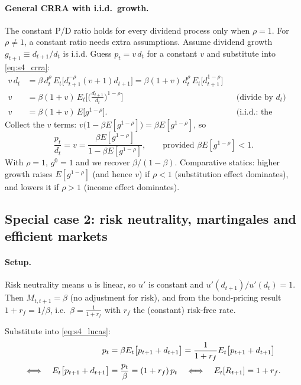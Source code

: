 \paragraph{General CRRA with i.i.d.\ growth.}
The constant P/D ratio holds for every dividend process only when $\rho=1$. For $\rho\ne1$, a constant ratio needs extra assumptions. Assume dividend growth $g_{t+1}\equiv d_{t+1}/d_t$ is i.i.d. Guess $p_t = v\,d_t$ for a constant $v$ and substitute into \eqref{eq:s4_crra}:
\begin{align*}
  v\,d_t &= \beta\,d_t^{\rho}\,E_t\big[d_{t+1}^{-\rho}(v+1)d_{t+1}\big]
          = \beta(1+v)\,d_t^{\rho}\,E_t\big[d_{t+1}^{1-\rho}\big]\\
  v &= \beta(1+v)\,E_t\Big[\Big(\frac{d_{t+1}}{d_t}\Big)^{1-\rho}\Big] && \text{(divide by $d_t$)}\\
  v &= \beta(1+v)\,E\big[g^{1-\rho}\big]. && \text{(i.i.d.: the expectation is a constant)}
\end{align*}
Collect the $v$ terms: $v\big(1-\beta E[g^{1-\rho}]\big)=\beta E[g^{1-\rho}]$, so
\[
  \frac{p_t}{d_t} = v = \frac{\beta E[g^{1-\rho}]}{1-\beta E[g^{1-\rho}]},\qquad \text{provided } \beta E[g^{1-\rho}]<1 .
\]
With $\rho=1$, $g^{0}=1$ and we recover $\beta/(1-\beta)$. Comparative statics: higher growth raises $E[g^{1-\rho}]$ (and hence $v$) if $\rho<1$ (substitution effect dominates), and lowers it if $\rho>1$ (income effect dominates).

\subsection{Special case 2: risk neutrality, martingales and efficient markets }

\paragraph{Setup.} Risk neutrality means $u$ is linear, so $u'$ is constant and $u'(d_{t+1})/u'(d_t)=1$. Then $M_{t,t+1}=\beta$ (no adjustment for risk), and from the bond-pricing result $1+r_f = 1/\beta$, i.e.\ $\beta=\frac{1}{1+r_f}$ with $r_f$ the (constant) risk-free rate.

Substitute into \eqref{eq:s4_lucas}:
\begin{align}
  p_t &= \beta E_t\big[p_{t+1}+d_{t+1}\big] = \frac{1}{1+r_f}E_t\big[p_{t+1}+d_{t+1}\big] \notag\\
  \Longleftrightarrow\quad E_t\big[p_{t+1}+d_{t+1}\big] &= \frac{p_t}{\beta} = (1+r_f)\,p_t
  \quad\Longleftrightarrow\quad E_t[R_{t+1}] = 1+r_f . \label{eq:s4_rn}
\end{align}

